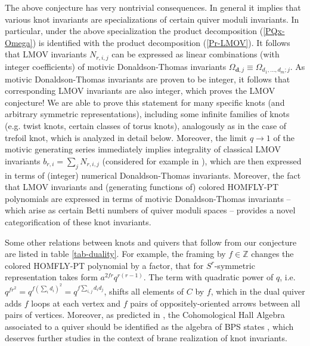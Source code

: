 \documentclass[
 reprint,
 amsmath,amssymb,
 aps,prl
]{revtex4-1}
\begin{document}
The above conjecture has very nontrivial consequences. In general it implies that various knot invariants are specializations of certain quiver moduli invariants. In particular, under the above specialization the product decomposition (\ref{PQx-Omega}) is identified with the product decomposition (\ref{Pr-LMOV}). It follows that LMOV invariants $N_{r,i,j}$ can be expressed as linear combinations (with integer coefficients) of motivic Donaldson-Thomas invariants $\Omega_{{\bm d},j}\equiv \Omega_{d_1,\ldots,d_m;j}$. As motivic Donaldson-Thomas invariants are proven to be integer, it follows that corresponding LMOV invariants are also integer, which proves the LMOV conjecture! 
We are able to prove this statement for many specific knots (and arbitrary symmetric representations), including some infinite families of knots (e.g. twist knots, certain classes of torus knots), analogously as in the case of trefoil knot, which is analyzed in detail below. Moreover, the limit $q\to 1$ of the motivic generating series immediately implies integrality of classical LMOV invariants $b_{r,i}=\sum_j N_{r,i,j}$ (considered for example in \cite{Garoufalidis:2015ewa}), which are then expressed in terms of (integer) numerical Donaldson-Thomas invariants. Moreover, the fact that LMOV invariants and (generating functions of) colored HOMFLY-PT polynomials are expressed in terms of motivic Donaldson-Thomas invariants -- which arise as certain Betti numbers of quiver moduli spaces -- provides a novel categorification of these knot invariants. 

Some other relations between knots and quivers that follow from our conjecture are listed in table \ref{tab-duality}. For example, the framing by $f\in \mathbb{Z}$ changes the colored HOMFLY-PT polynomial by a factor, that for $S^r$-symmetric representation takes form $a^{2fr}q^{r(r-1)}$. The term with quadratic power of $q$, i.e. $q^{fr^2}=q^{f(\sum_i d_i)^2} = q^{f\sum_{i,j} d_i d_j}$, shifts all elements of $C$ by $f$, which in the dual quiver adds $f$ loops at each vertex and $f$ pairs of oppositely-oriented arrows between all pairs of vertices. Moreover, as predicted in \cite{Kontsevich:2010px}, the Cohomological Hall Algebra associated to a quiver should be identified as the algebra of BPS states \cite{Harvey:1996gc}, which deserves further studies in the context of brane realization of knot invariants.
\end{document}
